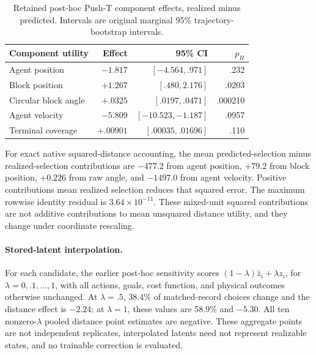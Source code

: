 \begin{table}[h]
\caption{Retained post-hoc Push-T component effects, realized minus predicted.
Intervals are original marginal 95\% trajectory-bootstrap intervals.}
\label{tab:appendix_components}
\centering
\begin{tabular}{lrrr}
\toprule
Component utility & Effect & 95\% CI & $p_H$\\
\midrule
Agent position & $-1.817$ & $[-4.564,.971]$ & .232\\
Block position & $+1.267$ & $[.480,2.176]$ & .0203\\
Circular block angle & $+.0325$ & $[.0197,.0471]$ & .000210\\
Agent velocity & $-5.809$ & $[-10.523,-1.187]$ & .0957\\
Terminal coverage & $+.00901$ & $[.00035,.01696]$ & .110\\
\bottomrule
\end{tabular}
\end{table}

For exact native squared-distance accounting, the mean predicted-selection
minus realized-selection contributions are $-477.2$ from agent position,
$+79.2$ from block position, $+0.226$ from raw angle, and $-1497.0$ from agent
velocity. Positive contributions mean realized selection reduces that squared
error. The maximum rowwise identity residual is $3.64\times10^{-11}$.
These mixed-unit squared contributions are not additive contributions to mean
unsquared distance utility, and they change under coordinate rescaling.

\paragraph{Stored-latent interpolation.}
For each candidate, the earlier post-hoc sensitivity scores
$(1-\lambda)\hat z_i+\lambda z_i$, for $\lambda=0,.1,\ldots,1$, with all
actions, goals, cost function, and physical outcomes otherwise unchanged. At
$\lambda=.5$, 38.4\% of matched-record choices change and the distance effect
is $-2.24$; at $\lambda=1$, these values are 58.9\% and $-5.30$.
All ten nonzero-$\lambda$ pooled distance point estimates are negative.
These aggregate points are not independent replicates, interpolated latents
need not represent realizable states, and no trainable correction is evaluated.

